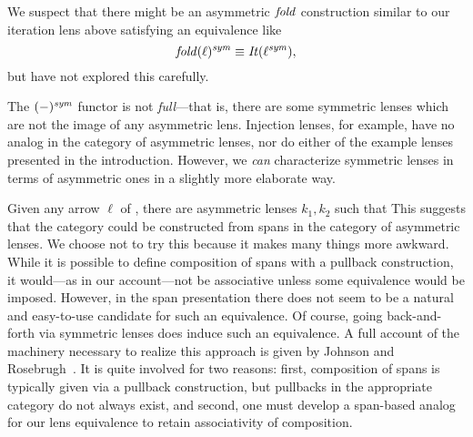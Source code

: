 \begin{defn}[$R$-similarity]
\begin{theorem}
\begin{lemma}
\begin{theorem}[No products]
\begin{lemma}
\begin{defn}
\begin{theorem}
\begin{theorem}
\begin{corollary}[Hylomorphism]
\begin{defn}
\begin{defn}
\begin{defn}[Symmetrization]
We suspect that there might be an asymmetric $\mathit{fold}$ construction
similar to our iteration lens above satisfying an equivalence like
\[\mathit{fold}(\ell)^\mathit{sym} \equiv \mathit{It}(\ell^\mathit{sym}),\]
but have not explored this carefully.

The $(-)^\mathit{sym}$ functor is not {\em full}---that is,
there are some symmetric lenses which are not the image of any asymmetric
lens. Injection lenses, for example, have no analog in the category of
asymmetric lenses, nor do either of the example lenses presented in the
introduction. However, we \emph{can} characterize symmetric lenses in
terms of asymmetric ones in a slightly more elaborate way.

\iffull
\begin{theorem}\label{asymmetrization_of_lenses}
\else
\begin{theorem}\label{asymmetrization_of_lenses}
\fi
  Given any arrow $\ell$ of \LENS{}, there are asymmetric lenses
  $k_1,k_2$ such that  \iffull This suggests that the category \LENS{} could be
  constructed from spans in the category of asymmetric lenses.
  \ifcomplement
  We choose not to try this because
  it makes many things more awkward. While it is possible to define
  composition of spans with a pullback construction, it would---as in
  our account---not be associative unless some equivalence would be
  imposed. However, in the span presentation there does not seem to be
  a natural and easy-to-use candidate for such an equivalence. Of
  course, going back-and-forth via symmetric lenses does induce such
  an equivalence.
  \else
  A full account of the machinery necessary to realize this approach is
  given by Johnson and Rosebrugh~\cite{johnson2014spans}. It is quite
  involved for two reasons: first, composition of spans is typically given
  via a pullback construction, but pullbacks in the appropriate category do
  not always exist, and second, one must develop a span-based analog for our
  lens equivalence to retain associativity of composition.
  \fi%
  \fi%
\end{theorem}


\end{theorem}
\end{defn}
\end{defn}
\end{defn}
\end{corollary}
\end{theorem}
\end{theorem}
\end{defn}
\end{lemma}
\end{theorem}
\end{lemma}
\end{theorem}
\end{defn}
